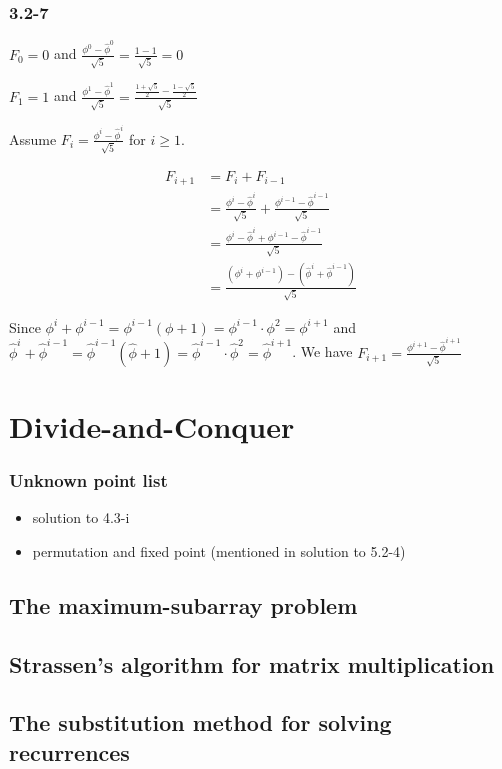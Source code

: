 \documentclass{book}
\begin{document}
\begin{CJK}{UTF8}{gkai}
\subsection*{3.2-7}
$F_0 = 0$ and $\frac{\phi^0 - \hat{\phi}^0}{\sqrt{5}}=\frac{1-1}{\sqrt{5}}=0$

$F_1=1$ and $\frac{\phi^1 - \hat{\phi}^1}{\sqrt{5}}=\frac{\frac{1+\sqrt{5}}{2}
-\frac{1-\sqrt{5}}{2}}{\sqrt{5}}$

Assume $F_i = \frac{\phi^i-\hat{\phi}^i}{\sqrt{5}}$ for $i \geq 1$.


\begin{align*}
  F_{i+1}  & = F_{i} + F_{i-1} \\
            &  = \frac{\phi^i - \hat{\phi}^i}{\sqrt{5}} + \frac{\phi^{i-1} -
\hat{\phi}^{i-1}}{\sqrt{5}} \\
&  = \frac{\phi^i - \hat{\phi}^i + \phi^{i-1}- \hat{\phi}^{i-1}}{\sqrt{5}} \\
            &  = \frac{(\phi^i + \phi^{i-1})- (\hat{\phi}^i + \hat{\phi}^{i-1})}{\sqrt{5}}
\end{align*}

Since $\phi^i + \phi^{i-1}=\phi^{i-1}(\phi+1)=\phi^{i-1}\cdot\phi^2=\phi^{i+1}$
and $\hat{\phi}^i +
\hat{\phi}^{i-1}=\hat{\phi}^{i-1}(\hat{\phi}+1)=\hat{\phi}^{i-1}\cdot\hat{\phi}^2=\hat{\phi}^{i+1}$.
We have $F_{i+1}=\frac{\phi^{i+1}-\hat{\phi}^{i+1}}{\sqrt{5}}$

\chapter{Divide-and-Conquer}
\subsection*{Unknown point list}
\begin{itemize}
\item solution to 4.3-i
\item permutation and fixed point (mentioned in solution to 5.2-4)
\end{itemize}

\section{The maximum-subarray problem}
\section{Strassen's algorithm for matrix multiplication}
\section{The substitution method for solving recurrences}


\end{CJK}
\end{document}
